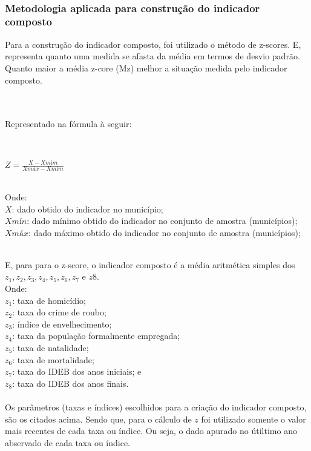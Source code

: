 \documentclass[a4paper, 10pt]{article}
\begin{document}
 \\
  \subsubsection{Metodologia aplicada para construção do indicador composto}

 Para a construção do indicador composto, foi utilizado o método de z-scores. E, representa quanto uma medida se afasta da média em termos de desvio padrão. Quanto maior a média z-core (Mz) melhor a situação medida pelo indicador composto.

 
 \\
 \newline
 \\
 Representado na fórmula à seguir:
 
 \\
 \begin{center}
 $Z=\frac{X-X{mím}}{X{máx}-X{mím}}$
 \end{center}
 \\
 Onde:
\\
\noindent
$X$: dado obtido do indicador no município;
\\
\noindent
$X{mín}$: dado mínimo obtido do indicador no conjunto de amostra (municípios);
\\
\noindent
$X{máx}$: dado máximo obtido do indicador no conjunto de amostra (municípios);

\\ 
E, para para  o z-score, o indicador composto é a média aritmética simples dos $z{_1}, z{_2}, z{_3}, z{_4}, z{_5}, z{_6}, z{_7}$ e $z{8}$. 
\\
\noindent
Onde:
\\
$z{_1}$: taxa de homicídio;
\\
$z{_2}$: taxa do crime de roubo;
\\
$z{_3}$: índice de envelhecimento;
\\
$z{_4}$: taxa da população formalmente empregada;
\\
$z{_5}$: taxa de natalidade;
\\
$z{_6}$: taxa de mortalidade;
\\
$z{_7}$: taxa do IDEB dos anos iniciais; e
\\
$z{_8}$: taxa do IDEB dos anos finais.
\\
\\

Os parâmetros (taxas e índices) escolhidos para a criação do indicador composto, são os citados acima. Sendo que, para o cálculo de $z$ foi utilizado somente o valor mais recentes de cada taxa ou índice. Ou seja, o dado apurado no útiltimo ano abservado de cada taxa ou índice. 
\end{document}
